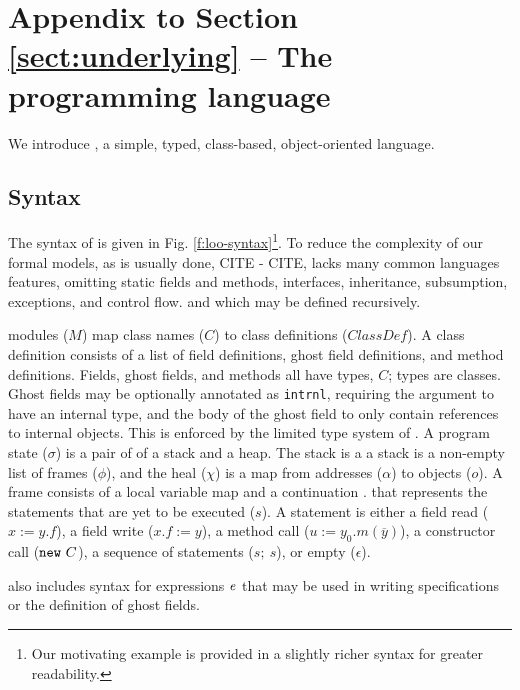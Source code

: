\section{Appendix to Section \ref{sect:underlying} -- The programming language \LangOO}
\label{app:loo}


We introduce \LangOO, a simple, typed, class-based, object-oriented language.

\subsection{Syntax}

The syntax of \LangOO is given in Fig. \ref{f:loo-syntax}\footnote{{Our motivating example is provided in a slightly richer syntax for greater readability.}}.
To reduce the complexity of our formal models, as is usually done, CITE - CITE,  \LangOO lacks many
common languages features, omitting static fields and methods, interfaces,
inheritance, subsumption, exceptions, and control flow.  
 \LangOO %
and which may be defined recursively.

\LangOO modules ($M$) map class names ($C$) to class definitions ($\textit{ClassDef}$).
A class definition consists of %
a list of field definitions, ghost field definitions, and method definitions.
{Fields, ghost fields, and methods all have types, $C$; {types are
    classes}.
    Ghost fields may be optionally 
 annotated as \texttt{intrnl}, requiring the argument to have an internal type, and the 
body of the ghost field to only contain references to internal objects. This is enforced by the
limited type system of \LangOO.}
A program state ($\sigma$) is a pair of of a stack and a heap.
The stack is a a stack is a non-empty list of frames ($\phi$), and the heal ($\chi$)
is a map from addresses ($\alpha$) to objects ($o$). A frame consists of a local variable
map and a continuation . that represents the statements that are yet to be executed ($s$).
A statement is either a field read ($x := y.f$), a field write ($x.f := y$), a method call
($u :=y_0.m(\overline{y})$), a constructor call ($\mbox{\normalfont{\texttt{new}}}\ C$), 
  a sequence of statements ($s;\ s$),
  or empty ($\epsilon$).


\LangOO also includes syntax for expressions $\mathit{e}$ that may %
be used in writing
specifications or the definition of ghost fields.





